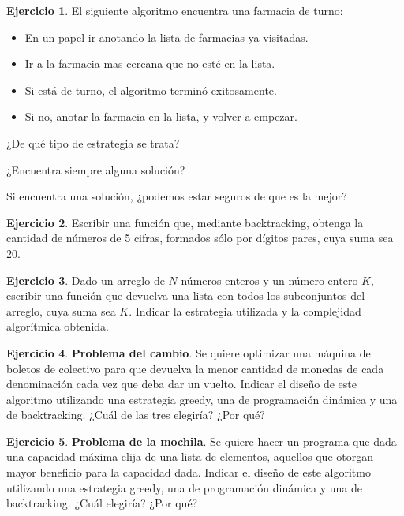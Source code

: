 \documentclass[11pt,a4paper]{article}
\theoremstyle{definition}
\newtheorem{ejercicio}{Ejercicio}[section]
\begin{document}
\begin{ejercicio}
El siguiente algoritmo encuentra una farmacia de turno:
\begin{itemize}
\item En un papel ir anotando la lista de farmacias ya visitadas.
\item Ir a la farmacia mas cercana que no esté en la lista.
\item Si está de turno, el algoritmo terminó exitosamente.
\item Si no, anotar la farmacia en la lista, y volver a empezar.
\end{itemize}

\begin{partes}
\item ¿De qué tipo de estrategia se trata?
\item ¿Encuentra siempre alguna solución?
\item Si encuentra una solución, ¿podemos estar seguros de que es la mejor?
\end{partes}
\end{ejercicio}

\begin{ejercicio}
Escribir una función que, mediante backtracking, obtenga la cantidad de
números de 5 cifras, formados sólo por dígitos pares, cuya suma sea 20.
\end{ejercicio}

\begin{ejercicio}
Dado un arreglo de $N$ números enteros y un número entero $K$, escribir una
función que devuelva una lista con todos los subconjuntos del arreglo,
cuya suma sea $K$. Indicar la estrategia utilizada y la complejidad
algorítmica obtenida.
\end{ejercicio}

\begin{ejercicio}
\textbf{Problema del cambio}.
Se quiere optimizar una máquina de boletos de colectivo para que devuelva
la menor cantidad de monedas de cada denominación cada vez que deba dar un
vuelto. Indicar el diseño de este algoritmo utilizando una estrategia
greedy, una de programación dinámica y una de backtracking. ¿Cuál de las
tres elegiría? ¿Por qué?
\end{ejercicio}

\begin{ejercicio}
\textbf{Problema de la mochila}.
Se quiere hacer un programa que dada una capacidad máxima elija de una
lista de elementos, aquellos que otorgan mayor beneficio para la capacidad
dada. Indicar el diseño de este algoritmo utilizando una estrategia greedy,
una de programación dinámica y una de backtracking. ¿Cuál elegiría? ¿Por
qué?
\end{ejercicio}
\end{document}
